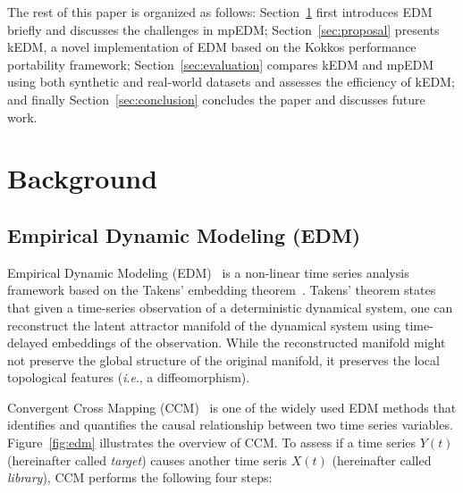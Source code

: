 \documentclass{acmart}
\begin{document}
The rest of this paper is organized as follows: Section~\ref{sec:background}
first introduces EDM briefly and discusses the challenges in mpEDM\@;
Section~\ref{sec:proposal} presents kEDM, a novel implementation of EDM based on the Kokkos performance portability framework;
Section~\ref{sec:evaluation} compares kEDM and mpEDM using both synthetic and real-world datasets and assesses the efficiency of kEDM\@; and finally
Section~\ref{sec:conclusion} concludes the paper and discusses future work.

\section{Background}\label{sec:background}

\subsection{Empirical Dynamic Modeling (EDM)}\label{sec:edm}

Empirical Dynamic Modeling (EDM)~\cite{Chang2017,Ye2015} is a non-linear time
series analysis framework based on the Takens' embedding
theorem~\cite{Takens1981,Deyle2011}. Takens' theorem states that given a time-series
observation of a deterministic dynamical system, one can reconstruct the
latent attractor manifold of the dynamical system using time-delayed
embeddings of the observation. While the reconstructed manifold might not
preserve the global structure of the original manifold, it preserves the local
topological features (\textit{i}.\textit{e}., a diffeomorphism).

Convergent Cross Mapping (CCM)~\cite{Sugihara2012,Natsukawa2017,VanBerkel2020}
is one of the widely used EDM methods that identifies and quantifies the causal
relationship between two time series variables. Figure~\ref{fig:edm} illustrates the
overview of CCM\@. To assess if a time series $Y(t)$ (hereinafter called \textit{target})
causes another time seris $X(t)$ (hereinafter called \textit{library}), CCM performs
the following four steps:
\end{document}
